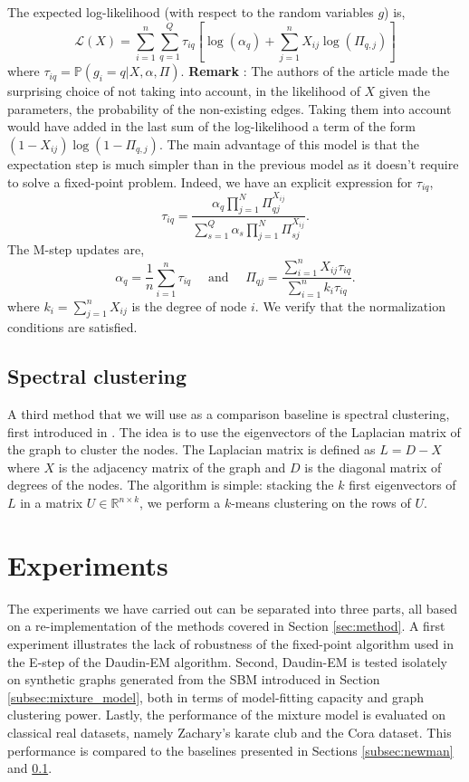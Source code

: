 \documentclass[switch, 12pt]{article}
\newcommand{\jump}{\newline\newline}
\begin{document}
\begin{multicols}{2}
    The expected log-likelihood (with respect to the random variables $g$) is,
    \begin{equation}
        \mathcal{L}(X) = \sum_{i=1}^n\sum_{q=1}^Q \tau_{iq} \left[ \log(\alpha_q) + \sum_{j=1}^n X_{ij} \log(\Pi_{q, j}) \right]
    \end{equation}
    where $\tau_{iq} = \mathbb{P}(g_i = q | X, \alpha, \Pi)$.
    \newline
    \textbf{Remark} : The authors of the article made the surprising choice of not taking into account, in the likelihood of $X$ given the parameters, the probability of the non-existing edges. Taking them into account would have added in the last sum of the log-likelihood a term of the form $(1 - X_{ij}) \log(1 - \Pi_{q, j})$.
    \jump
    The main advantage of this model is that the expectation step is much simpler than in the previous model as it doesn't require to solve a fixed-point problem. Indeed, we have an explicit expression for $\tau_{iq}$,
    $$ \tau_{iq} = \frac{\alpha_q\prod_{j=1}^N \Pi_{qj}^{X_{ij}}}{\sum_{s=1}^Q \alpha_s\prod_{j=1}^N \Pi_{sj}^{X_{ij}}}.$$
    The M-step updates are,
    $$ \alpha_q = \frac{1}{n} \sum_{i=1}^n \tau_{iq} \quad\text{ and }\quad \Pi_{qj} = \frac{\sum_{i=1}^n X_{ij}\tau_{iq} }{\sum_{i=1}^n k_i \tau_{iq}}.$$
    where $k_i = \sum_{j=1}^n X_{ij}$ is the degree of node $i$. We verify that the normalization conditions are satisfied.

    \subsection{Spectral clustering}
    \label{subsec:spectral}
    A third method that we will use as a comparison baseline is spectral clustering, first introduced in \cite{spectral}. The idea is to use the eigenvectors of the Laplacian matrix of the graph to cluster the nodes. The Laplacian matrix is defined as $ L = D - X$ where $X$ is the adjacency matrix of the graph and $D$ is the diagonal matrix of degrees of the nodes.
    \jump
    The algorithm is simple: stacking the $k$ first eigenvectors of $L$ in a matrix $U \in \mathbb{R}^{n \times k}$, we perform a $k$-means clustering on the rows of $U$.

    \section{Experiments}
    \label{sec:experiments}

    The experiments we have carried out can be separated into three parts, all based on a re-implementation of the methods covered in Section \ref{sec:method}. A first experiment illustrates the lack of robustness of the fixed-point algorithm used in the E-step of the Daudin-EM algorithm.
    Second, Daudin-EM is tested isolately on synthetic graphs generated from the SBM introduced in Section \ref{subsec:mixture_model}, both in terms of model-fitting capacity and graph clustering power.
    Lastly, the performance of the mixture model is evaluated on classical real datasets, namely Zachary's karate club and the Cora dataset. This performance is compared to the baselines presented in Sections \ref{subsec:newman} and \ref{subsec:spectral}.


\end{multicols}
\end{document}
